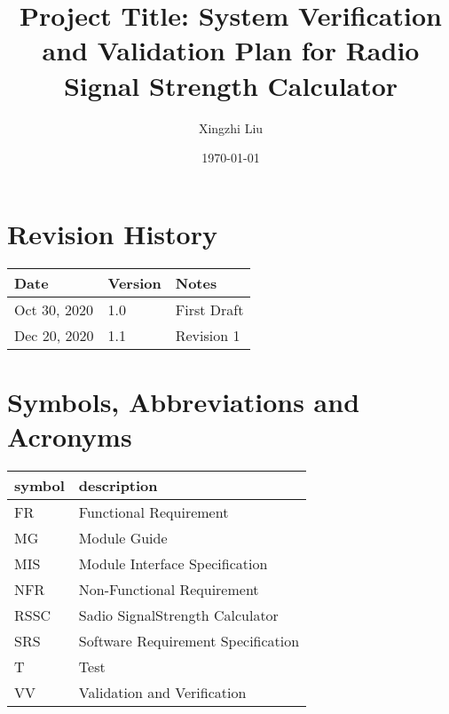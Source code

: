 \documentclass[12pt, titlepage]{article}
\begin{document}
\title{Project Title: System Verification and Validation Plan for Radio Signal Strength Calculator} 
\author{Xingzhi Liu}
\date{\today}
	
\maketitle


\section{Revision History}

\begin{tabularx}{\textwidth}{p{3cm}p{2cm}X}
\toprule {\bf Date} & {\bf Version} & {\bf Notes}\\
\midrule
Oct 30, 2020 & 1.0 & First Draft\\
Dec 20, 2020 & 1.1 & Revision 1\\
\bottomrule
\end{tabularx}

\newpage

\tableofcontents

\listoftables

\listoffigures

\newpage

\section{Symbols, Abbreviations and Acronyms}

\renewcommand{\arraystretch}{1.2}
\begin{tabular}{l l} 
  \toprule		
  \textbf{symbol} & \textbf{description}\\
  \midrule 
  FR & Functional Requirement\\
  MG & Module Guide\\
  MIS & Module Interface Specification\\
  NFR & Non-Functional Requirement\\
  RSSC & Sadio SignalStrength Calculator\\
  SRS & Software Requirement Specification\\
  T & Test\\
  VV & Validation and Verification\\
  \bottomrule
\end{tabular}\\

\newpage
\end{document}
